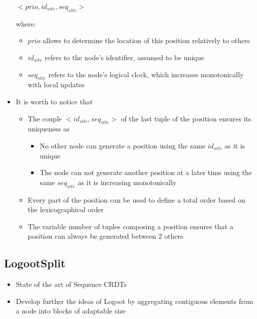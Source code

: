 \documentclass{article}
\begin{document}
\begin{itemize}
    \begin{center}
        $<prio, id_{site}, seq_{site}>$
    \end{center}

    where:

    \begin{itemize}
        \item $prio$ allows to determine the location of this position relatively to others
        \item $id_{site}$ refers to the node's identifier, assumed to be unique
        \item $seq_{site}$ refers to the node's logical clock, which increases monotonically with local updates
    \end{itemize}


    \item It is worth to notice that
    \begin{itemize}
        \item The couple $<id_{site}, seq_{site}>$ of the last tuple of the position ensures its uniqueness as
        \begin{itemize}
            \item No other node can generate a position using the same $id_{site}$ as it is unique
            \item The node can not generate another position at a later time using the same $seq_{site}$ as it is increasing monotonically
        \end{itemize}
        \item Every part of the position can be used to define a total order based on the lexicographical order
        \item The variable number of tuples composing a position ensures that a position can always be generated between 2 others
    \end{itemize}
\end{itemize}

\subsection{LogootSplit \cite{AndreCollaborateCom2013}}

\begin{itemize}
    \item State of the art of Sequence \acp{CRDT}
    \item Develop further the ideas of Logoot by aggregating contiguous elements from a node into blocks of adaptable size 
\end{itemize}
\end{document}
